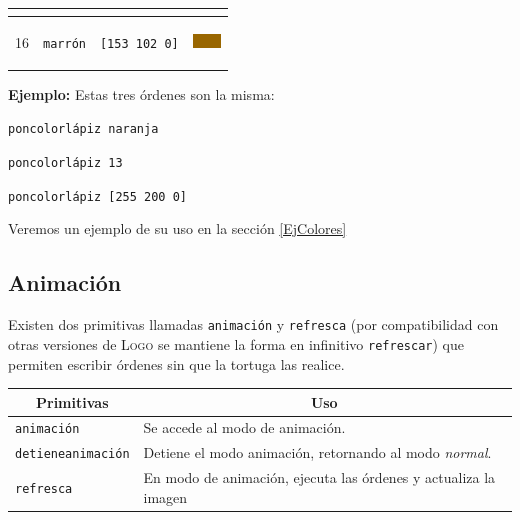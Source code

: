 \begin{center}
\begin{longtable}{|*{4}{c|}}
\begin{minipage}[m]{1.5cm}
\begin{center}
                    \vspace{0.2cm} \end{center}
                              \end{minipage} \\ \hline
   16 & \texttt{marr\'on} \index{marr\'on@\texttt{marr\'on}}
      & \texttt{[153 102  0]} &  \begin{minipage}[m]{1.5cm} \begin{center}
                 \vspace{0.2cm} \definecolor{brown}{rgb}{0.6,0.4,0}
              \includegraphics{Imagenes/05_Primitivas/16_marron.png}
                    \vspace{0.2cm} \end{center}
                       \end{minipage} \\ \hline
\end{longtable}\end{center}

\noindent \textbf{Ejemplo:} Estas tres \'ordenes son la misma:

   \texttt{poncolorl\'apiz naranja}

   \texttt{poncolorl\'apiz 13}

   \texttt{poncolorl\'apiz [255 200 0]}

\noindent Veremos un ejemplo de su uso en la secci\'on \ref{EjColores}

\subsection{Animaci\'on}
   \label{animaci\'on}

Existen dos primitivas llamadas \texttt{animaci\'on}%
%
y \texttt{refresca} (por compatibilidad con otras versiones de
\textsc{Logo} se mantiene la forma en infinitivo \texttt{refrescar})%
% 
 que permiten
escribir \'ordenes sin que la tortuga las realice.

\begin{center} \begin{longtable}{|m{4cm}|m{9cm}|} \hline 
   \multicolumn{1}{|c|}{\textbf{Primitivas}} &
         \multicolumn{1}{c|}{\textbf{Uso}} \\ \endhead \hline 
   \texttt{animaci\'on} &  
      Se accede al modo de animaci\'on. \\ \hline 
   \texttt{detieneanimaci\'on} & 
      Detiene el modo animaci\'on, retornando al modo \textit{normal}.\\ \hline 
   \texttt{refresca} &  
      En modo de animaci\'on, ejecuta las \'ordenes y actualiza la imagen 
           \\ \hline
\end{longtable} \end{center}

